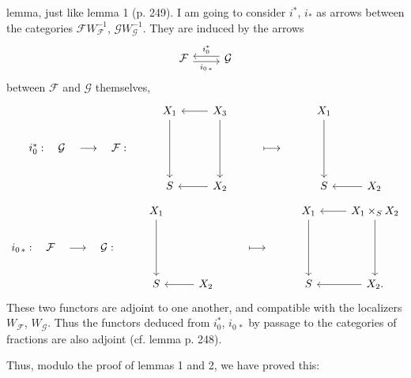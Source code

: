 \documentclass[11pt]{article}
\newcommand{\printedpage}[1]{\marginpar{\footnotesize p.~#1}}
\newcommand{\msp}[1]{\marginpar{\footnotesize [#1]}}
\begin{document}
lemma, just like lemma 1 (p. 249). I am going to consider $i^*$, $i_*$ as arrows between the categories $\mathcal{F}W_{\mathcal{F}}^{-1}$, $\mathcal{G}W_{\mathcal{G}}^{-1}$. They are induced by the arrows %
\[
\begin{tikzcd}[ampersand replacement=\&]
\mathcal{F} \arrow[r, shift right, "i_{0\,*}"'] \& \mathcal{G} \arrow[l, shift right, "i_0^*"']
\end{tikzcd}
\]
between $\mathcal{F}$ and $\mathcal{G}$ themselves, %
\[
\begin{tikzcd}[ampersand replacement=\&]
 \& X_1 \arrow[dd] \& X_3 \arrow[l] \arrow[dd] \& \& X_1 \arrow[dd] \& \\
i_0^* :\quad \mathcal{G}\quad\longrightarrow\quad\mathcal{F} : \& \& \& \longmapsto \& \& \\
 \& S \& X_2 \arrow[l] \& \& S \& X_2 \arrow[l]
\end{tikzcd}
\]
\[
\begin{tikzcd}[ampersand replacement=\&]
 \& X_1 \arrow[dd] \& \& \& X_1 \arrow[dd] \& X_1\times_S X_2 \arrow[l] \arrow[dd] \\
i_{0\,*} :\quad \mathcal{F}\quad\longrightarrow\quad\mathcal{G} : \& \& \& \longmapsto \& \& \\
 \& S \& X_2 \arrow[l] \& \& S \& X_2. \arrow[l]
\end{tikzcd}
\]
These two functors are adjoint to one another, and compatible with the localizers $W_{\mathcal{F}}$, $W_{\mathcal{G}}$. Thus the functors deduced from $i_0^*$, $i_{0\,*}$ by passage to the categories of fractions are also adjoint (cf. lemma p. 248).

Thus, modulo the proof of lemmas 1 and 2, we have proved this:

\printedpage{164}

\msp{page 253}
\end{document}
